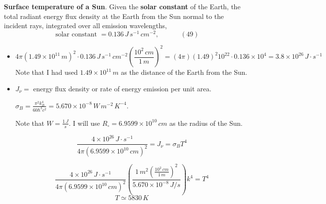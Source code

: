   \textbf{ Surface temperature of a Sun}.  
Given the \textbf{solar constant} of the Earth, the total radiant energy flux density at the Earth from the Sun normal to the incident rays, integrated over all emission wavelengths, 
\[
\text{ solar constant } = 0.136 \, J \, s^{-1} \, cm^{-2}, \quad \quad \quad \, (49)
\]
\begin{itemize}
\item[(a)] \[
4 \pi (1.49 \times 10^{11} \, m )^2 \cdot 0.136 \, J \, s^{-1} \, cm^{-2} \left( \frac{ 10^2 \, cm}{ 1 \, m } \right)^2 = (4 \pi ) ( 1.49)^2 10^{22} \cdot 0.136 \times 10^4 = \boxed{ 3.8 \times 10^{26} \, J \cdot s^{-1} }
\]
Note that I had used $1.49 \times 10^{11} \, m$ as the distance of the Earth from the Sun.  
\item[(b)] $J_{\nu} = $ energy flux density or rate of energy emission per unit area.  

$\sigma_B = \frac{ \pi^2 k_B^4}{ 60 \hbar^3 c^2 } = 5.670 \times 10^{-8} \, W \, m^{-2} \, K^{-4}$.

Note that $W = \frac{1 \, J}{s}$.  I will use $R_{\circ} = 6.9599 \times 10^{10} \, cm$ as the radius of the Sun.  

\[
\frac{ 4 \times 10^{26} \, J \cdot s^{-1} }{ 4 \pi ( 6.9599 \times 10^{10} \, cm)^2 } = J_{\nu} = \sigma_B T^4
\]

\[
\frac{ 4 \times 10^{26} \, J \cdot s^{-1} }{ 4 \pi ( 6.9599 \times 10^{10} \, cm)^2 } \left( \frac{ 1 \, m^2 \left( \frac{ 10^2 \, cm }{ 1 \, m } \right)^2  }{ 5.670 \times 10^{-8} \, J/s } \right)k^4 = T^4
\]
\[
\boxed{ T \simeq 5830 \, K }
\]
\end{itemize} 

